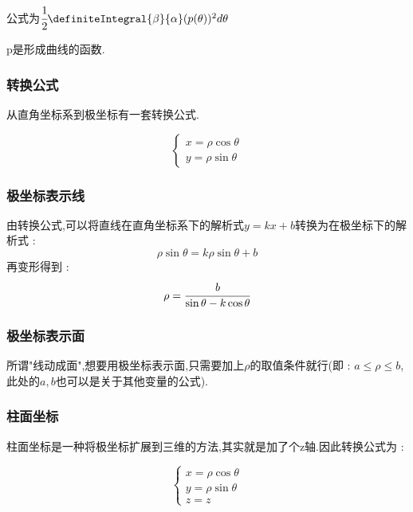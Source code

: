 {{{    公式为$\cfrac{1}{2}\definiteIntegral{\beta}{\alpha}(p(\theta))^2d\theta$

    p是形成曲线的函数.
    }%

    \subsubsection{转换公式}{
        从直角坐标系到极坐标有一套转换公式.

        $$
            \begin{cases}
                x = \rho\cos\theta \\
                y = \rho\sin\theta
            \end{cases}
        $$
    }%

    \subsubsection{极坐标表示线}{
        \begin{center}
        \end{center}

        由转换公式,可以将直线在直角坐标系下的解析式$y = kx + b$转换为在极坐标下的解析式 :
        $$
            \rho\sin\theta = k\rho\sin\theta + b
        $$
        再变形得到 :
        $$
            \rho = \cfrac{b}{\sin\theta - k\cos\theta}
        $$
    }%

    \subsubsection{极坐标表示面}{
        所谓"线动成面",想要用极坐标表示面,只需要加上$\rho$的取值条件就行(即 : $a \leq \rho \leq b$,此处的$a,b$也可以是关于其他变量的公式).
    }%

    \subsubsection{柱面坐标}{
        柱面坐标是一种将极坐标扩展到三维的方法,其实就是加了个z轴.因此转换公式为 :

        $$
            \begin{cases}
                x = \rho\cos\theta \\
                y = \rho\sin\theta \\
                z = z
            \end{cases}
        $$
    }%

}}
